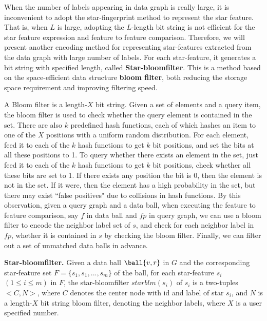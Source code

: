 
When the number of labels appearing in data graph is really large, it is inconvenient to adopt the star-fingerprint method to represent the star feature. That is, when $L$ is large, adopting the $L$-length bit string is not efficient for the star feature expression and feature to feature comparison. Therefore, we will present another encoding method for representing star-features extracted from the data graph with large number of labels. For each star-feature, it generates a bit string with specified length, called \textbf{Star-bloomfilter}. This is a method based on the space-efficient data structure \textbf{bloom filter}, both reducing the storage space requirement and improving filtering speed.

A Bloom filter is a length-$X$ bit string. Given a set of elements and a query item, the bloom filter is used to check whether the query element is contained in the set. There are also $k$ predefined hash functions, each of which hashes an item to one of the $X$ positions with a uniform random distribution. For each element, feed it to each of the $k$ hash functions to get $k$ bit positions, and set the bits at all these positions to 1. To query whether there exists an element in the set, just feed it to each of the $k$ hash functions to get $k$ bit positions, check whether all these bits are set to 1. If there exists any position the bit is 0, then the element is not in the set. If it were, then the element has a high probability in the set, but there may exist ``false positives" due to collisions in hash functions. By this observation, given a query graph and a data ball, when executing the feature to feature comparison, say $f$ in data ball and $fp$ in query graph, we can use a bloom filter to encode the neighbor label set of $s$, and check for each neighbor label in $fp$, whether it is contained in $s$ by checking the bloom filter. Finally, we can filter out a set of unmatched data balls in advance.

\begin{definition} {\textbf{Star-bloomfilter.}}
\label{def-ind-str-large-label}
Given a data ball $\ball{v, r}$ in $G$ and the corresponding star-feature set $F=\{s_1, s_1,..., s_m\}$  of the ball, for each star-feature $s_i$ $(1 \leq i \leq m)$ in $F$, the star-bloomfilter $starblm(s_i)$ of $s_i$ is a two-tuples $<C,N>$, where $C$ denotes the center node with id and label of star $s_i$, and $N$ is a length-$X$ bit string bloom filter, denoting the neighbor labels, where $X$ is a user specified number.
\end{definition}

